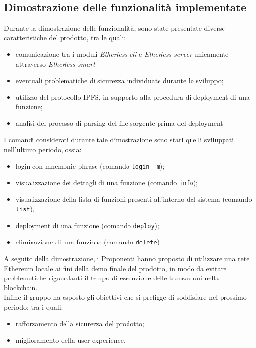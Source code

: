\subsection{Dimostrazione delle funzionalità implementate}
Durante la dimostrazione delle funzionalità, sono state presentate diverse caratteristiche del prodotto\textit{}, tra le quali:
\begin{itemize}
	\item comunicazione tra i moduli\textit{} \textit{Etherless-cli} e 	\textit{Etherless-server} unicamente attraverso \textit{Etherless-smart};
	\item eventuali problematiche di sicurezza individuate durante lo sviluppo;
	\item utilizzo del protocollo IPFS, in supporto alla procedura di deployment\textit{} di una funzione;
	\item analisi del processo di parsing del file sorgente prima del deployment\textit{}.
\end{itemize}
I comandi considerati durante tale dimostrazione sono stati quelli sviluppati nell'ultimo periodo, ossia:
\begin{itemize}
	\item login con mnemonic phrase (comando \texttt{login -m});
	\item visualizzazione dei dettagli di una funzione (comando \texttt{info});
	\item visualizzazione della lista di funzioni presenti all'interno del sistema (comando \texttt{list});
	\item deployment\textit{} di una funzione (comando \texttt{deploy});
	\item eliminazione di una funzione (comando \texttt{delete}).
\end{itemize}
A seguito della dimostrazione, i Proponenti\textit{} hanno proposto di utilizzare una rete Ethereum\textit{} locale ai fini della demo finale del prodotto\textit{}, in modo da evitare problematiche riguardanti il tempo di esecuzione delle transazioni nella blockchain\textit{}. \\
Infine il gruppo ha esposto gli obiettivi che si prefigge di soddisfare nel prossimo periodo: tra i quali:
\begin{itemize}
	\item rafforzamento della sicurezza del prodotto\textit{};
	\item miglioramento della user experience.
\end{itemize}
